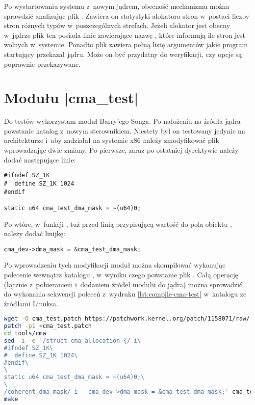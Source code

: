 Po wystartowaniu systemu z~nowym jądrem, obecność mechanizmu 
można sprawdzić analizując plik .  Zawiera on
statystyki alokatora stron w~postaci liczby stron różnych typów
w~poszczególnych strefach.  Jeżeli alokator  jest obecny
w~jądrze plik ten posiada linie zawierające nazwę , które
informują ile stron  jest wolnych w~systemie.  Ponadto plik
 zawiera pełną listę argumentów jakie program
startujący przekazał jądru.  Może on być przydatny do weryfikacji, czy
opcje są poprawnie przekazywane.


\section{Modułu \code|cma_test|}

Do testów  wykorzystam moduł Barry'ego Songa.  Po nałożeniu
\autocite{patch:cma-test} na źródła jądra powstanie katalog
 z~nowym sterownikiem.  Niestety był on testowany
jedynie na architekturze  i~aby zadziałał na systemie x86
należy zmodyfikować plik  wprowadzając dwie zmiany.
Po pierwsze, zaraz po ostatniej dyrektywie  należy
dodać następujące linie:

\begin{lstlisting}[numbers=none]
#ifndef SZ_1K
#  define SZ_1K 1024
#endif

static u64 cma_test_dma_mask = ~(u64)0;
\end{lstlisting}

Po wtóre, w~funkcji , tuż przed linią przypisującą
wartość do pola  obiektu ,
należy dodać linijkę:

\begin{lstlisting}[numbers=none]
	cma_dev->dma_mask = &cma_test_dma_mask;
\end{lstlisting}

Po wprowadzeniu tych modyfikacji moduł można skompilować wykonując
polecenie  wewnątrz katalogu , w~wyniku
czego powstanie plik .  Całą operację (łącznie
z~pobieraniem i~dodaniem źródeł modułu do jądra) można sprowadzić do
wykonania sekwencji poleceń z~wydruku \ref{lst:compile-cma-test}
w~katalogu ze źródłami Linuksa.

\begin{lstlisting}[float=tb,caption=Sekwencja komend dodająca
    i~budująca moduł \code{cma_test}.,label=lst:compile-cma-test,
    language=sh,numbers=none,columns=fullflexible]
wget -O cma_test.patch https://patchwork.kernel.org/patch/1158071/raw/
patch -p1 <cma_test.patch
cd tools/cma
sed -i -e '/struct cma_allocation {/ i\
#ifndef SZ_1K\
#  define SZ_1K 1024\
#endif\
\
static u64 cma_test_dma_mask = ~(u64)0;\
\
/coherent_dma_mask/ i	cma_dev->dma_mask = &cma_test_dma_mask;' cma_test.c
make
\end{lstlisting}

